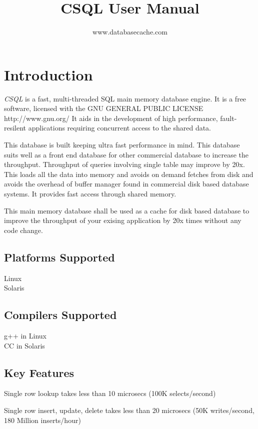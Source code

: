 \documentclass[12pt]{article}
\begin{document}
         

\title{CSQL User Manual } 
\author{www.databasecache.com} 
\date{} 
\maketitle 

\tableofcontents
\pagebreak

\section{Introduction}
\label{Introduction}

\emph {CSQL} is a fast, multi-threaded SQL main memory database engine. It is a free software, licensed with the GNU GENERAL PUBLIC LICENSE http://www.gnu.org/
It aids in the development of high performance, fault-resilent applications requiring concurrent access to the shared data. 

This database is built keeping ultra fast performance in mind. This database suits well as a front end database for other commercial database to increase the throughput. Throughput of queries involving single table may improve by 20x. This loads all the data into memory and avoids on demand fetches from disk and avoids the overhead of buffer manager found in commercial disk based database systems. It provides fast access through shared memory.

This main memory database shall be used as a cache for disk based database to improve the throughput of your exising application by 20x times without any code change. 
\subsection{Platforms Supported}
\label{psupported}
Linux \\
Solaris 

\subsection{Compilers Supported}
\label{csupported}
g++ in Linux \\
CC in Solaris

\subsection{Key Features}
\label{keyfeatures}
Single row lookup takes less than 10 microsecs (100K selects/second)

Single row insert, update, delete takes less than 20 microsecs (50K writes/second, 180 Million inserts/hour)
\end{document}
